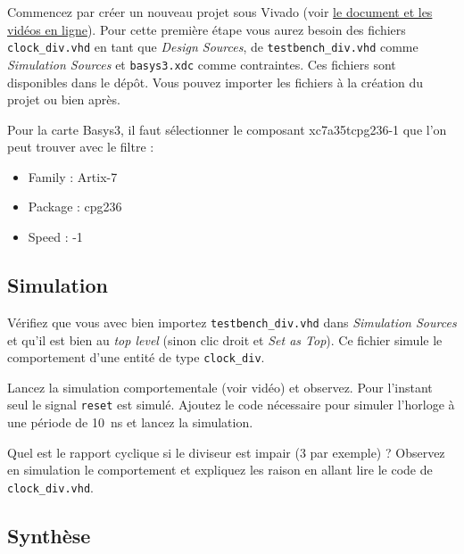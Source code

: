 \documentclass[11pt]{paper}
\begin{document}
Commencez par créer un nouveau projet sous Vivado (voir \href{https://hippocampus.ec-nantes.fr/course/view.php?id=2775#section-3}{le document et les vidéos en ligne}). 
Pour cette première étape vous aurez besoin des fichiers {\tt clock\_div.vhd} %
en tant que {\it Design Sources}, de {\tt testbench\_div.vhd} comme {\it Simulation Sources} et {\tt basys3.xdc} comme contraintes. Ces fichiers sont disponibles dans le dépôt. Vous pouvez importer les fichiers à la création du projet ou bien après.

Pour la carte Basys3, il faut sélectionner le composant \og xc7a35tcpg236-1 \fg que l'on peut trouver avec le filtre :
\begin{itemize}
	\item Family : Artix-7
	\item Package : cpg236
	\item Speed : -1
\end{itemize}


\subsection{Simulation}

Vérifiez que vous avec bien importez {\tt testbench\_div.vhd} dans {\it Simulation Sources} et qu'il est bien au {\it top level} (sinon clic droit et {\it Set as Top}). Ce fichier simule le comportement d'une entité de type {\tt clock\_div}.

Lancez la simulation comportementale (voir vidéo) et observez. Pour l'instant seul le signal {\tt reset} est simulé. Ajoutez le code nécessaire pour simuler l'horloge à une période de 10~ns et lancez la simulation.



Quel est le rapport cyclique si le diviseur est impair (3 par exemple) ? Observez en simulation le comportement et expliquez les raison en allant lire le code de {\tt clock\_div.vhd}.


\subsection{Synthèse}
\end{document}
